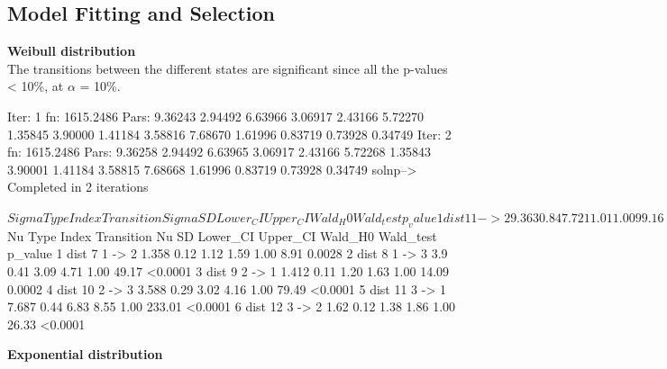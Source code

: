 \documentclass[11pt,a4paper]{article}
\begin{document}
\subsection{Model Fitting and Selection}
  
\textbf{Weibull distribution}\\

The transitions between the different states are significant since all the p-values < 10\%, at \(\alpha\) = 10\%.
\begin{Schunk}
\begin{Soutput}
Iter: 1 fn: 1615.2486	 Pars:  9.36243 2.94492 6.63966 3.06917 2.43166 5.72270 1.35845 3.90000 1.41184 3.58816 7.68670 1.61996 0.83719 0.73928 0.34749
Iter: 2 fn: 1615.2486	 Pars:  9.36258 2.94492 6.63965 3.06917 2.43166 5.72268 1.35843 3.90001 1.41184 3.58815 7.68668 1.61996 0.83719 0.73928 0.34749
solnp--> Completed in 2 iterations
\end{Soutput}
\begin{Soutput}
$Sigma
  Type Index Transition Sigma   SD Lower_CI Upper_CI Wald_H0 Wald_test p_value
1 dist     1     1 -> 2 9.363 0.84     7.72    11.01    1.00     99.16 <0.0001
2 dist     2     1 -> 3 2.945 0.13     2.70     3.19    1.00    236.13 <0.0001
3 dist     3     2 -> 1  6.64 0.47     5.72     7.56    1.00    143.66 <0.0001
4 dist     4     2 -> 3 3.069 0.11     2.85     3.29    1.00    335.01 <0.0001
5 dist     5     3 -> 1 2.432 0.03     2.37     2.49    1.00   2049.64 <0.0001
6 dist     6     3 -> 2 5.723 0.34     5.06     6.38    1.00    197.66 <0.0001

$Nu
  Type Index Transition    Nu   SD Lower_CI Upper_CI Wald_H0 Wald_test p_value
1 dist     7     1 -> 2 1.358 0.12     1.12     1.59    1.00      8.91  0.0028
2 dist     8     1 -> 3   3.9 0.41     3.09     4.71    1.00     49.17 <0.0001
3 dist     9     2 -> 1 1.412 0.11     1.20     1.63    1.00     14.09  0.0002
4 dist    10     2 -> 3 3.588 0.29     3.02     4.16    1.00     79.49 <0.0001
5 dist    11     3 -> 1 7.687 0.44     6.83     8.55    1.00    233.01 <0.0001
6 dist    12     3 -> 2  1.62 0.12     1.38     1.86    1.00     26.33 <0.0001
\end{Soutput}
\end{Schunk}

\textbf{Exponential distribution}
\end{document}

